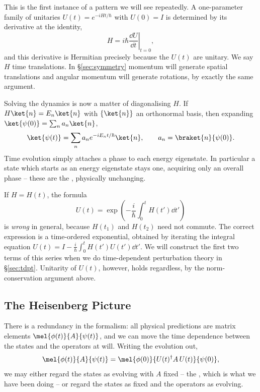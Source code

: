 This is the first instance of a pattern we will see repeatedly. A one-parameter family of unitaries $U(t) = e^{-iHt/\hbar}$ with $U(0) = I$ is determined by its derivative at the identity,
$$
H = i \hbar \left.\frac{\dd U}{\dd t}\right|_{t=0},
$$
and this derivative is Hermitian precisely because the $U(t)$ are unitary. We say $H$  time translations. In \S\ref{sec:symmetry} momentum will generate spatial translations and angular momentum will generate rotations, by exactly the same argument.

Solving the dynamics is now a matter of diagonalising $H$. If $H\ket{n} = E_n\ket{n}$ with $\{\ket{n}\}$ an orthonormal basis, then expanding $\ket{\psi(0)} = \sum_n a_n \ket{n}$,
$$
\ket{\psi(t)} = \sum_n a_n e^{-iE_n t/\hbar}\ket{n}, \qquad a_n = \braket{n}{\psi(0)}.
$$
Time evolution simply attaches a phase to each energy eigenstate. In particular a state which starts as an energy eigenstate stays one, acquiring only an overall phase -- these are the , physically unchanging.

\begin{remark}
    If $H = H(t)$, the formula
    $$
    U(t) = \exp\left(-\frac{i}{\hbar}\int_0^t H(t')\dd t'\right)
    $$
    is \emph{wrong} in general, because $H(t_1)$ and $H(t_2)$ need not commute. The correct expression is a time-ordered exponential, obtained by iterating the integral equation $U(t) = I - \frac{i}{\hbar}\int_0^t H(t')U(t')\dd t'$. We will construct the first two terms of this series when we do time-dependent perturbation theory in \S\ref{sec:tdpt}. Unitarity of $U(t)$, however, holds regardless, by the norm-conservation argument above.
\end{remark}

\subsection{The Heisenberg Picture}

There is a redundancy in the formalism: all physical predictions are matrix elements $\mel{\phi(t)}{A}{\psi(t)}$, and we can move the time dependence between the states and the operators at will. Writing the evolution out,
$$
\mel{\phi(t)}{A}{\psi(t)} = \mel{\phi(0)}{U(t)^\dagger A \, U(t)}{\psi(0)},
$$
we may either regard the states as evolving with $A$ fixed -- the , which is what we have been doing -- or regard the states as fixed and the operators as evolving.


